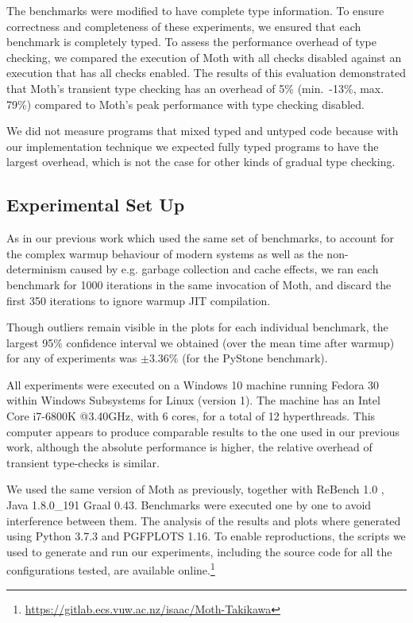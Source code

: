 \documentclass[sigplan,10pt,review,screen]{acmart}\settopmatter{printfolios=true}
\newcommand{\eg}{e.g.\xspace}
\begin{document}
The benchmarks were modified to have complete type information.  To
ensure correctness and completeness of these experiments, we ensured that each benchmark is completely typed.  To assess the performance
overhead of type checking, we compared the execution of Moth with all
checks disabled against an execution that has all checks enabled.  The
results of this evaluation demonstrated that Moth's transient type checking has an overhead of 5\% (min.\ -13\%,
max. 79\%) compared to Moth's peak performance with type checking disabled.

We did not measure programs that mixed typed and untyped code because
with our implementation technique we expected fully typed programs to
have the largest overhead, which is not the case for other kinds of
gradual type checking.

\subsection{Experimental Set Up}
As in our previous work \cite{roberts-and-co-ecoop-2019} which used the same set of benchmarks, to account for the complex warmup behaviour of modern systems \citep{Barrett:2017:VMW} as well as
the non-determinism caused by \eg garbage collection and cache effects, we ran each benchmark for 1000 iterations in the same invocation of Moth, and discard the first 350 iterations to ignore warmup JIT compilation.

Though outliers remain visible in the plots for each individual benchmark, the largest 95\% confidence interval we obtained (over the mean time after warmup) for any of experiments was $\pm3.36\%$ (for the PyStone benchmark).

All experiments were executed on a Windows 10 machine
running Fedora 30 within Windows Subsystems for Linux (version 1). The machine has an Intel Core i7-6800K @3.40GHz, with 6 cores, for a total of 12 hyperthreads. This computer appears to produce comparable results to the one used in our previous work, although the absolute performance is higher, the relative overhead of transient type-checks is similar.

We used the same version of Moth as previously, together with ReBench 1.0 \citep{ReBench:2018}, Java 1.8.0\_191 Graal 0.43. Benchmarks were executed one by one to avoid interference between them. The analysis of the results and plots where generated using Python 3.7.3 and PGFPLOTS 1.16. To enable reproductions, the scripts we used to generate and run our experiments, including the source code for all the configurations tested, are available online.\footnote{\url{https://gitlab.ecs.vuw.ac.nz/isaac/Moth-Takikawa}}
\end{document}
